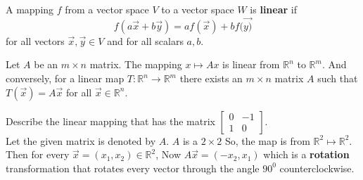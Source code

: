 \documentclass[math101_lecturenotes_ku.tex]{subfiles}
\begin{document}
\begin{mdframed}
    \begin{definition}
        A mapping $f$ from a vector space $V$ to a vector space $W$ is \textbf{linear} if $$f(a\vec{x}+b\vec{y}) = a f(\vec{x}) + b f(\vec{y)}$$ for all vectors $\vec{x}, \vec{y} \in V$ and for all scalars $a,b$.
    \end{definition}
\end{mdframed}

\begin{theorem}
    Let $A$ be an $m \times n$ matrix. The mapping $x \mapsto Ax$ is linear from $\mathbb{R}^n$ to $\mathbb{R}^m$. And conversely, for a linear map $T: \mathbb{R}^n \to \mathbb{R}^m$ there exists an $m \times n$ matrix $A$ such that $T(\vec{x})=A\vec{x}$ for all $\vec{x} \in \mathbb{R}^n$.
\end{theorem}

\begin{example}
    Describe the linear mapping that has the matrix $\begin{bmatrix}
        0 & -1 \\ 1 & 0
    \end{bmatrix}$. \\[1mm]
    Let the given matrix is denoted by $A$. $A$ is a $2 \times 2$ So, the map is from $\mathbb{R}^2 \mapsto \mathbb{R}^2$. Then for every $\vec{x}=(x_1,x_2) \in \mathbb{R}^2$, Now $A\vec{x}= (-x_2,x_1)$ which is a \textbf{rotation} transformation that rotates every vector through the angle $90^0$ counterclockwise.
\end{example}
\end{document}
